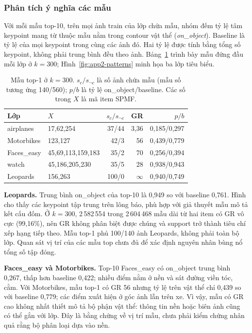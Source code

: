 \subsubsection{Phân tích ý nghĩa các mẫu}
Với mỗi mẫu top-10, trên mọi ảnh train của lớp chứa mẫu, nhóm đếm tỷ lệ tâm keypoint mang từ thuộc mẫu
nằm trong contour vật thể (\textit{on\_object}). Baseline là tỷ lệ của mọi keypoint trong cùng các ảnh đó.
Hai tỷ lệ được tính bằng tổng số keypoint, không phải trung bình đều theo ảnh. Bảng~\ref{tab:app2-top}
trình bày mẫu đứng đầu mỗi lớp ở $k=300$; Hình~\ref{fig:app2-patterns} minh họa ba lớp tiêu biểu.

\begin{table}[!t]
\centering
\caption{Mẫu top-1 ở $k=300$. $s_c/s_{\neg c}$ là số ảnh chứa mẫu (mẫu số tương ứng 140/560);
$p/b$ là tỷ lệ on\_object/baseline. Các số trong $X$ là mã item SPMF.}
\label{tab:app2-top}
\scriptsize\setlength{\tabcolsep}{2.5pt}
\begin{tabular}{llrrr}\hline
Lớp & $X$ & $s_c/s_{\neg c}$ & GR & $p/b$\\\hline
airplanes & 17,62,254 & 37/44 & 3,36 & 0,185/0,297\\
Motorbikes & 123,127 & 42/3 & 56 & 0,439/0,779\\
Faces\_easy & 45,69,113,159,183 & 35/2 & 70 & 0,256/0,394\\
watch & 45,186,205,230 & 35/5 & 28 & 0,938/0,943\\
Leopards & 156,263 & 100/0 & $\infty$ & 0,940/0,749\\\hline
\end{tabular}
\end{table}



\textbf{Leopards.} Trung bình on\_object của top-10 là 0,949 so với baseline 0,761. Hình cho thấy các
keypoint tập trung trên lông báo, phù hợp với giả thuyết mẫu mô tả kết cấu đốm. Ở $k=300$, 2\,582\,554
trong 2\,604\,468 mẫu dài từ hai item có GR vô cực (99,16\%), nên GR không phân biệt được chúng và support
trở thành tiêu chí xếp hạng tiếp theo. Mẫu top-1 phủ 100/140 ảnh Leopards, không phải toàn bộ lớp.
Quan sát vị trí của các mẫu top chưa đủ để xác định nguyên nhân bùng nổ tổng số tập đóng.

\textbf{Faces\_easy và Motorbikes.} Top-10 Faces\_easy có on\_object trung bình 0,267, thấp hơn baseline
0,422; nhiều điểm nằm ở nền và sát đường viền tóc, cằm. Với Motorbikes, mẫu top-1 có GR 56 nhưng tỷ lệ
trên vật thể chỉ 0,439 so với baseline 0,779; các điểm xuất hiện ở góc ảnh lẫn trên xe. Vì vậy, mẫu có GR
cao không nhất thiết mô tả bộ phận vật thể: thông tin nền hoặc biên ảnh cũng có thể gắn với lớp.
Đây là bằng chứng về vị trí mẫu, chưa phải kiểm chứng nhân quả rằng bộ phân loại dựa vào nền.

